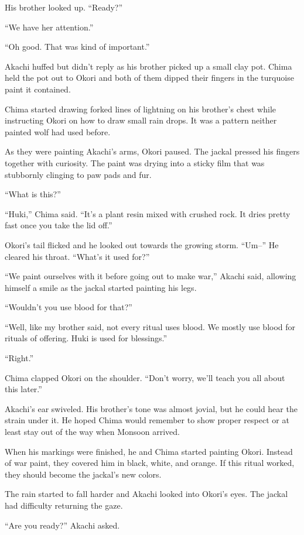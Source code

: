 His brother looked up. ``Ready?''

``We have her attention.''

``Oh good. That was kind of important.''

Akachi huffed but didn't reply as his brother picked up a small clay pot. Chima held the pot out to Okori and both of them dipped their fingers in the turquoise paint it contained.

Chima started drawing forked lines of lightning on his brother's chest while instructing Okori on how to draw small rain drops. It was a pattern neither painted wolf had used before.

As they were painting Akachi's arms, Okori paused. The jackal pressed his fingers together with curiosity. The paint was drying into a sticky film that was stubbornly clinging to paw pads and fur.

``What is this?''

``Huki,'' Chima said. ``It's a plant resin mixed with crushed rock. It dries pretty fast once you take the lid off.''

Okori's tail flicked and he looked out towards the growing storm. ``Um--'' He cleared his throat. ``What's it used for?''

``We paint ourselves with it before going out to make war,'' Akachi said, allowing himself a smile as the jackal started painting his legs.

``Wouldn't you use blood for that?''

``Well, like my brother said, not every ritual uses blood. We mostly use blood for rituals of offering. Huki is used for blessings.''

``Right.''

Chima clapped Okori on the shoulder. ``Don't worry, we'll teach you all about this later.''

Akachi's ear swiveled. His brother's tone was almost jovial, but he could hear the strain under it. He hoped Chima would remember to show proper respect or at least stay out of the way when Monsoon arrived.

When his markings were finished, he and Chima started painting Okori. Instead of war paint, they covered him in black, white, and orange. If this ritual worked, they should become the jackal's new colors.

The rain started to fall harder and Akachi looked into Okori's eyes. The jackal had difficulty returning the gaze.

``Are you ready?'' Akachi asked.

